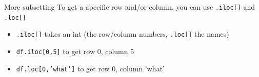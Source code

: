 \documentclass[handout]{beamer}
\begin{document}
\begin{frame}{More subsetting}
	To get a apecific row and/or column, you can use \texttt{.iloc[]} and \texttt{.loc[]}
\begin{itemize}[<+->]
	\item \texttt{.iloc[]} takes an int (the row/column numbers, \texttt{.loc[]} the names)
	\item \texttt{df.iloc[0,5]} to get row 0, column 5
	\item \texttt{df.loc[0,'what']} to get row 0, column 'what'
\end{itemize}

\end{frame}


{
\begin{frame}[plain]
\end{frame}

\begin{frame}[plain]
\end{frame}
}
\end{document}
